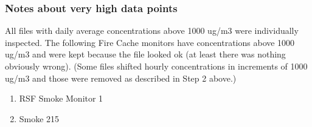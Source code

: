 \subsubsection{Notes about very high data points}

All files with daily average concentrations above 1000 ug/m3 were individually inspected. The following Fire Cache monitors have concentrations above 1000 ug/m3 and were kept because the file looked ok (at least there was nothing obviously wrong). (Some files shifted hourly concentrations in increments of 1000 ug/m3 and those were removed as described in Step 2 above.)
\begin{enumerate}[nolistsep]
\item RSF Smoke Monitor 1
\item Smoke 215
\end{enumerate}

